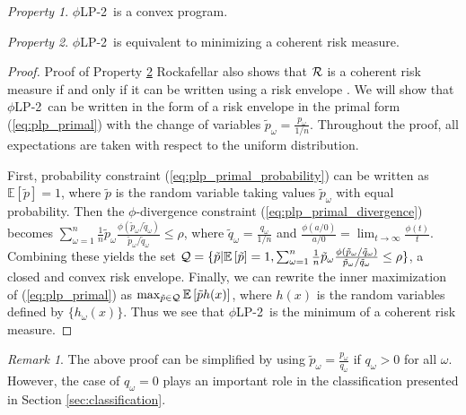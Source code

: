 \documentclass[12pt]{article}
\newcommand{\E}{\mathbb{E}}
\newcommand{\e}[1]{\E \left[ #1 \right]}
\theoremstyle{plain}
\theoremstyle{definition}
\theoremstyle{remark}
\newtheorem{remark}[theorem]{Remark}
\newtheorem{property}{Property}
\newcommand{\plp}{$\phi$LP-2}
\begin{document}
\begin{property}
	\label{property:convex}
	\plp\ is a convex program.
\end{property}

\begin{property}
	\label{property:coherent_risk_measure}
	\plp\ is equivalent to minimizing a coherent risk measure.
\end{property}

\begin{proof}{\sc Proof of Property \ref{property:coherent_risk_measure}}
	Rockafellar also shows that $\cal R$ is a coherent risk measure if and only if it can be written using a risk envelope \citep{rockafellar2007coherent}.
	We will show that \plp\ can be written in the form of a risk envelope in the primal form (\ref{eq:plp_primal}) with the change of variables $\tilde{p}_\omega = \frac{p_\omega}{1/n}$.
	Throughout the proof, all expectations are taken with respect to the uniform distribution.
	
	First, probability constraint (\ref{eq:plp_primal_probability}) can be written as $\e{\tilde{p}} = 1$, where $\tilde{p}$ is the random variable taking values $\tilde{p}_\omega$ with equal probability.
	Then the $\phi$-divergence constraint (\ref{eq:plp_primal_divergence}) becomes $\sum_{\omega=1}^n \frac{1}{n} \tilde{p}_\omega \frac{\phi\left(\tilde{p}_\omega/\tilde{q}_\omega\right)}{\tilde{p}_\omega/\tilde{q}_\omega} \leq \rho$, where $\tilde{q}_\omega = \frac{q_\omega}{1/n}$ and $\frac{\phi(a/0)}{a/0} = \lim_{t \rightarrow \infty} \frac{\phi(t)}{t}$.
	Combining these yields the set ${\cal Q} = \{\tilde{p} | \e{\tilde{p}} = 1, \sum_{\omega=1}^n \frac{1}{n} \tilde{p}_\omega \frac{\phi\left(\tilde{p}_\omega/\tilde{q}_\omega\right)}{\tilde{p}_\omega/\tilde{q}_\omega} \leq \rho \}$, a closed and convex risk envelope.
	Finally, we can rewrite the inner maximization of (\ref{eq:plp_primal}) as $\max_{\tilde{p} \in {\cal Q}} \e{\tilde{p} h(x)}$, where $h(x)$ is the random variables defined by $\{h_\omega(x)\}$.
	Thus we see that \plp\ is the minimum of a coherent risk measure.
\end{proof}

\begin{remark}
	The above proof can be simplified by using $\tilde{p}_\omega = \frac{p_\omega}{q_\omega}$ if $q_\omega > 0$ for all $\omega$.
	However, the case of $q_\omega = 0$ plays an important role in the classification presented in Section \ref{sec:classification}.
\end{remark}
\end{document}
